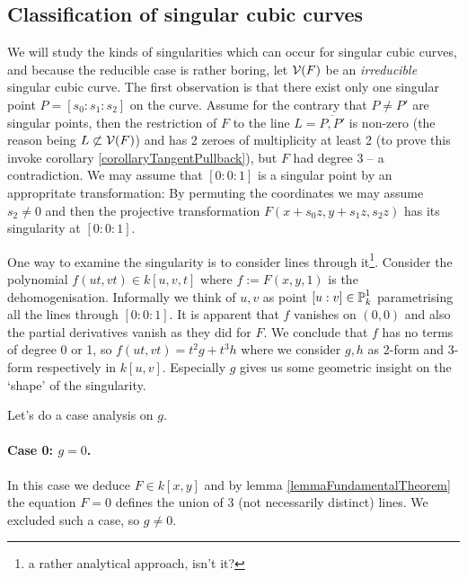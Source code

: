 \subsection{Classification of singular cubic curves}

We will study the kinds of singularities which can occur for singular cubic curves, and because the reducible case is rather boring,
let $\operatorname{\mathcal V}(F)$ be an \emph{irreducible} singular cubic curve.
The first observation is that there exist only one singular point $P = [s_0:s_1:s_2]$ on the curve.
Assume for the contrary that $P \neq P'$ are singular points, then the restriction of $F$ to the line $L = \overline{P,P'}$ is non-zero (the reason being $L \not\subset \operatorname{\mathcal V}(F)$) and has 2 zeroes of multiplicity at least 2 (to prove this invoke corollary \ref{corollaryTangentPullback}), but $F$ had degree 3 -- a contradiction.
We may assume that $[0:0:1]$ is a singular point by an appropritate transformation:
By permuting the coordinates we may assume $s_2 \neq 0$ and then the projective transformation $F(x+s_0z,y+s_1z,s_2z)$ has its singularity at $[0:0:1]$.

One way to examine the singularity is to consider lines through it\footnote{a rather analytical approach, isn't it?}.
Consider the polynomial $f(ut, vt) \in k[u,v,t]$ where $f := F(x,y,1)$ is the dehomogenisation.
Informally we think of $u,v$ as point $[u:v] \in \operatorname{\mathbb P}^1_k$ parametrising all the lines through $[0:0:1]$.
It is apparent that $f$ vanishes on $(0,0)$ and also the partial derivatives vanish as they did for $F$.
We conclude that $f$ has no terms of degree 0 or 1, so $f(ut,vt) = t^2g + t^3h$ where we consider $g,h$ as 2-form and 3-form respectively in $k[u,v]$.
Especially $g$ gives us some geometric insight on the `shape' of the singularity.

Let's do a case analysis on $g$.
\paragraph{Case 0: $g=0$.}
In this case we deduce $F \in k[x,y]$ and by lemma \ref{lemmaFundamentalTheorem} the equation $F=0$ defines the union of 3 (not necessarily distinct) lines.
We excluded such a case, so $g \neq 0$.

